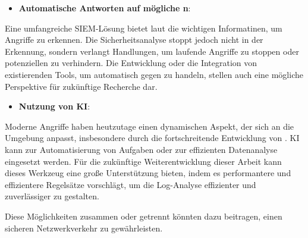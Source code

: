 \begin{itemize}[noitemsep]
    \item \textbf{Automatische Antworten auf mögliche n}:
\end{itemize}

Eine umfangreiche \gls{SIEM}-Lösung bietet laut \cite{Mohammed_NOC} die wichtigen Informatinen, um Angriffe zu erkennen. Die Sicherheitsanalyse stoppt jedoch nicht in der Erkennung, sondern verlangt Handlungen, um laufende Angriffe zu stoppen oder potenziellen zu verhindern. Die Entwicklung oder die Integration von existierenden Tools, um automatisch gegen  zu handeln, stellen auch eine mögliche Perspektive für zukünftige Recherche dar.

\begin{itemize}[noitemsep]
    \item \textbf{Nutzung von \gls{KI}}:
\end{itemize}

Moderne Angriffe haben heutzutage einen dynamischen Aspekt, der sich an die Umgebung anpasst, insbesondere durch die fortschreitende Entwicklung von  \citep{Guembe_AIHACKER}. \gls{KI} kann zur Automatisierung von Aufgaben oder zur effizienten Datenanalyse eingesetzt werden. Für die zukünftige Weiterentwicklung dieser Arbeit kann dieses Werkzeug eine große Unterstützung bieten, indem es performantere und effizientere Regelsätze vorschlägt, um die Log-Analyse effizienter und zuverlässiger zu gestalten. 

Diese Möglichkeiten zusammen oder getrennt könnten dazu beitragen, einen sicheren Netzwerkverkehr zu gewährleisten.